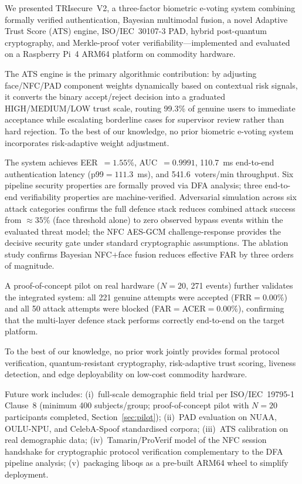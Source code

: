 \documentclass[pdflatex,sn-vancouver-num]{sn-jnl}%
\theoremstyle{thmstyleone}%
\theoremstyle{thmstyletwo}%
\theoremstyle{thmstylethree}%
\begin{document}
We presented TRIsecure~V2, a three-factor biometric e-voting system combining
formally verified authentication, Bayesian multimodal fusion, a novel Adaptive
Trust Score (ATS) engine, ISO/IEC~30107-3 PAD, hybrid post-quantum
cryptography, and Merkle-proof voter verifiability---implemented and evaluated
on a Raspberry Pi~4 ARM64 platform on commodity hardware.

The ATS engine is the primary algorithmic contribution: by adjusting
face/NFC/PAD component weights dynamically based on contextual risk signals, it
converts the binary accept/reject decision into a graduated HIGH/MEDIUM/LOW
trust scale, routing 99.3\% of genuine users to immediate acceptance while
escalating borderline cases for supervisor review rather than hard rejection.
To the best of our knowledge, no prior biometric e-voting system incorporates
risk-adaptive weight adjustment.

The system achieves EER~\(=1.55\%\), AUC~\(=0.9991\), 110.7~ms end-to-end
authentication latency (p99\(=111.3\)~ms), and 541.6~voters/min throughput.
Six pipeline security properties are formally proved via DFA analysis; three
end-to-end verifiability properties are machine-verified. Adversarial
simulation across six attack categories confirms the full defence stack reduces
combined attack success from \(\approx35\%\) (face threshold alone) to zero
observed bypass events within the evaluated threat model; the NFC AES-GCM
challenge-response provides the decisive security gate under standard
cryptographic assumptions. The ablation study confirms Bayesian NFC\(+\)face
fusion reduces effective FAR by three orders of magnitude.

A proof-of-concept pilot on real hardware (\(N{=}20\), 271 events) further
validates the integrated system: all 221 genuine attempts were accepted
(FRR\(=0.00\%\)) and all 50 attack attempts were blocked
(FAR\(=\)ACER\(=0.00\%\)), confirming that the multi-layer defence stack
performs correctly end-to-end on the target platform.

To the best of our knowledge, no prior work jointly provides formal protocol
verification, quantum-resistant cryptography, risk-adaptive trust scoring,
liveness detection, and edge deployability on low-cost commodity hardware.

Future work includes: (i)~full-scale demographic field trial per
ISO/IEC~19795-1 Clause~8 (minimum 400 subjects/group; proof-of-concept pilot
with \(N{=}20\) participants completed, Section~\ref{sec:pilot});
(ii)~PAD evaluation on NUAA, OULU-NPU, and CelebA-Spoof standardised corpora;
(iii)~ATS calibration on real demographic data;
(iv)~Tamarin/ProVerif model of the NFC session handshake for cryptographic
protocol verification complementary to the DFA pipeline analysis;
(v)~packaging liboqs as a pre-built ARM64 wheel to simplify deployment.
\end{document}
